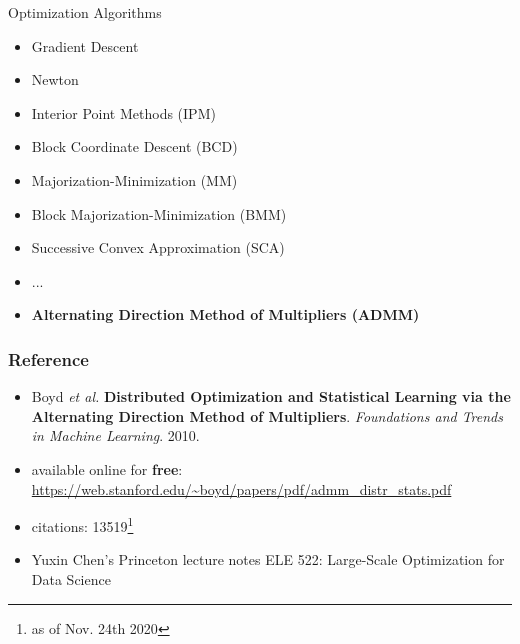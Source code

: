 \documentclass[aspectratio=169]{beamer}
\begin{document}
        \begin{frame}{Optimization Algorithms}
          \begin{itemize}
            \item Gradient Descent
            \item Newton
            \item Interior Point Methods (IPM)
            \item Block Coordinate Descent (BCD)
            \item Majorization-Minimization (MM)
            \item Block Majorization-Minimization (BMM)
            \item Successive Convex Approximation (SCA)
            \pause
            \item ...
            \pause
            \item \bf{Alternating Direction Method of Multipliers (ADMM)}
          \end{itemize}
        \end{frame}
  \begin{frame}
    \frametitle{Reference}
          \begin{itemize}
            \item Boyd \textit{et al.} \textbf{Distributed Optimization and Statistical Learning via the Alternating Direction Method of Multipliers}.
              \textit{Foundations and Trends in Machine Learning}. 2010.
            \item available online for \textbf{free}: \url{https://web.stanford.edu/\~boyd/papers/pdf/admm\_distr\_stats.pdf}
            \item citations: 13519\footnote{as of Nov. 24th 2020}
            \item Yuxin Chen's Princeton lecture notes ELE 522: Large-Scale Optimization for Data Science
          \end{itemize}
  \end{frame}
\end{document}
